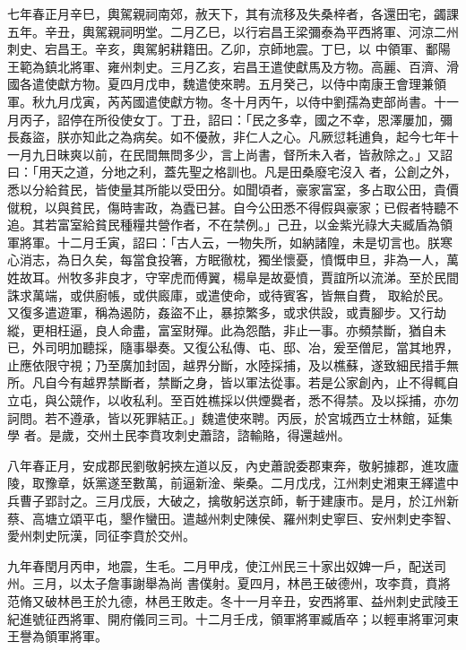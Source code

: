 \begin{pinyinscope}
 七年春正月辛巳，輿駕親祠南郊，赦天下，其有流移及失桑梓者，各還田宅，蠲課五年。辛丑，輿駕親祠明堂。二月乙巳，以行宕昌王梁彌泰為平西將軍、河涼二州刺史、宕昌王。辛亥，輿駕躬耕籍田。乙卯，京師地震。丁巳，以
 中領軍、鄱陽王範為鎮北將軍、雍州刺史。三月乙亥，宕昌王遣使獻馬及方物。高麗、百濟、滑國各遣使獻方物。夏四月戊申，魏遣使來聘。五月癸己，以侍中南康王會理兼領軍。秋九月戊寅，芮芮國遣使獻方物。冬十月丙午，以侍中劉孺為吏部尚書。十一月丙子，詔停在所役使女丁。丁丑，詔曰：「民之多幸，國之不幸，恩澤屢加，彌長姦盜，朕亦知此之為病矣。如不優赦，非仁人之心。凡厥愆耗逋負，起今七年十一月九日昧爽以前，在民間無問多少，言上尚書，督所未入者，皆赦除之。」又詔曰：「用天之道，分地之利，蓋先聖之格訓也。凡是田桑廢宅沒入
 者，公創之外，悉以分給貧民，皆使量其所能以受田分。如聞頃者，豪家富室，多占取公田，貴價僦稅，以與貧民，傷時害政，為蠹已甚。自今公田悉不得假與豪家；已假者特聽不追。其若富室給貧民種糧共營作者，不在禁例。」己丑，以金紫光祿大夫臧盾為領軍將軍。十二月壬寅，詔曰：「古人云，一物失所，如納諸隍，未是切言也。朕寒心消志，為日久矣，每當食投箸，方眠徹枕，獨坐懷憂，憤慨申旦，非為一人，萬姓故耳。州牧多非良才，守宰虎而傅翼，楊阜是故憂憤，賈誼所以流涕。至於民間誅求萬端，或供廚帳，或供廄庫，或遣使命，或待賓客，皆無自費，
 取給於民。又復多遣遊軍，稱為遏防，姦盜不止，暴掠繁多，或求供設，或責腳步。又行劫縱，更相枉逼，良人命盡，富室財殫。此為怨酷，非止一事。亦頻禁斷，猶自未已，外司明加聽採，隨事舉奏。又復公私傳、屯、邸、冶，爰至僧尼，當其地界，止應依限守視；乃至廣加封固，越界分斷，水陸採捕，及以樵蘇，遂致細民措手無所。凡自今有越界禁斷者，禁斷之身，皆以軍法從事。若是公家創內，止不得輒自立屯，與公競作，以收私利。至百姓樵採以供煙爨者，悉不得禁。及以採捕，亦勿訶問。若不遵承，皆以死罪結正。」魏遣使來聘。丙辰，於宮城西立士林館，延集學
 者。是歲，交州土民李賁攻刺史蕭諮，諮輸賂，得還越州。



 八年春正月，安成郡民劉敬躬挾左道以反，內史蕭說委郡東奔，敬躬據郡，進攻廬陵，取豫章，妖黨遂至數萬，前逼新淦、柴桑。二月戊戌，江州刺史湘東王繹遣中兵曹子郢討之。三月戊辰，大破之，擒敬躬送京師，斬于建康市。是月，於江州新蔡、高塘立頌平屯，墾作蠻田。遣越州刺史陳侯、羅州刺史寧巨、安州刺史李智、愛州刺史阮漢，同征李賁於交州。



 九年春閏月丙申，地震，生毛。二月甲戌，使江州民三十家出奴婢一戶，配送司州。三月，以太子詹事謝舉為尚
 書僕射。夏四月，林邑王破德州，攻李賁，賁將范脩又破林邑王於九德，林邑王敗走。冬十一月辛丑，安西將軍、益州刺史武陵王紀進號征西將軍、開府儀同三司。十二月壬戌，領軍將軍臧盾卒；以輕車將軍河東王譽為領軍將軍。




\end{pinyinscope}
